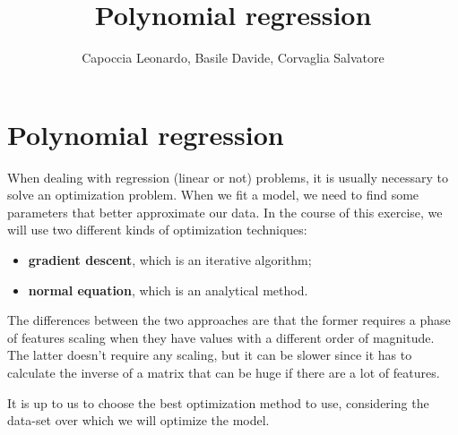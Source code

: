 \documentclass[11pt]{article}
\title{Polynomial regression}
\begin{document}
    
    \author{Capoccia Leonardo,
    Basile Davide, Corvaglia
    Salvatore}    
    
    \maketitle
    
    

    
    \hypertarget{polynomial-regression}{%
\section{Polynomial regression}\label{polynomial-regression}}

When dealing with regression (linear or not) problems, it is usually necessary to solve an optimization problem. When we fit a model, we need to find some parameters that better approximate our data.
In the course of this exercise, we will use two
different kinds of optimization techniques:
\begin{itemize}
    \item \textbf{gradient descent}, which is an iterative algorithm;
    \item \textbf{normal equation}, which is an analytical method.
\end{itemize}

The differences between the two approaches are that the former requires a phase of features scaling when they have values with a different order of magnitude. The latter doesn’t require any scaling, but it can be slower since it has to calculate the inverse of a matrix that can be huge if there are a lot of features.

It is up to us to choose the best optimization method to use, considering the data-set over which we will optimize the model.
\end{document}
